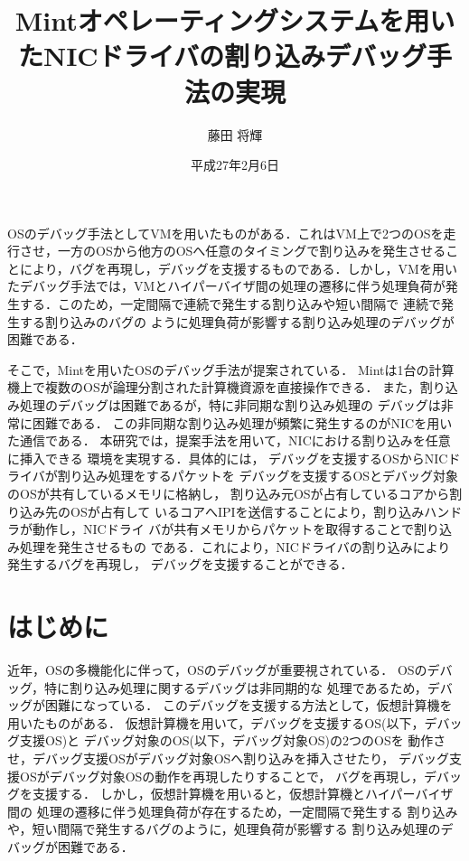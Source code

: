 \documentclass[tanilab-enum]{graduate}
\title{Mintオペレーティングシステムを用いたNICドライバの割り込みデバッグ手法の実現}
\author{藤田 将輝}
\date{平成27年2月6日}
\begin{document}
\maketitle

  OSのデバッグ手法としてVMを用いたものがある．これはVM上で2つのOSを走
行させ，一方のOSから他方のOSへ任意のタイミングで割り込みを発生させるこ
とにより，バグを再現し，デバッグを支援するものである．しかし，VMを用い
たデバッグ手法では，VMとハイパーバイザ間の処理の遷移に伴う処理負荷が発
生する．このため，一定間隔で連続で発生する割り込みや短い間隔で
連続で発生する割り込みのバグの
ように処理負荷が影響する割り込み処理のデバッグが困難である．

そこで，Mintを用いたOSのデバッグ手法が提案されている．
Mintは1台の計算機上で複数のOSが論理分割された計算機資源を直接操作できる．
また，割り込み処理のデバッグは困難であるが，特に非同期な割り込み処理の
デバッグは非常に困難である．
この非同期な割り込み処理が頻繁に発生するのがNICを用いた通信である．
本研究では，提案手法を用いて，NICにおける割り込みを任意に挿入できる
環境を実現する．具体的には，
デバッグを支援するOSからNICドライバが割り込み処理をするパケットを
デバッグを支援するOSとデバッグ対象のOSが共有しているメモリに格納し，
割り込み元OSが占有しているコアから割り込み先のOSが占有して
いるコアへIPIを送信することにより，割り込みハンドラが動作し，NICドライ
バが共有メモリからパケットを取得することで割り込み処理を発生させるもの
である．これにより，NICドライバの割り込みにより発生するバグを再現し，
デバッグを支援することができる．


\tableandlists%

\chapter{はじめに}\label{chap:introduction}
近年，OSの多機能化に伴って，OSのデバッグが重要視されている．
OSのデバッグ，特に割り込み処理に関するデバッグは非同期的な
処理であるため，デバッグが困難になっている．
このデバッグを支援する方法として，仮想計算機を用いたものがある．
仮想計算機を用いて，デバッグを支援するOS(以下，デバッグ支援OS)と
デバッグ対象のOS(以下，デバッグ対象OS)の2つのOSを
動作させ，デバッグ支援OSがデバッグ対象OSへ割り込みを挿入させたり，
デバッグ支援OSがデバッグ対象OSの動作を再現したりすることで，
バグを再現し，デバッグを支援する．
しかし，仮想計算機を用いると，仮想計算機とハイパーバイザ間の
処理の遷移に伴う処理負荷が存在するため，一定間隔で発生する
割り込みや，短い間隔で発生するバグのように，処理負荷が影響する
割り込み処理のデバッグが困難である．
\end{document}
